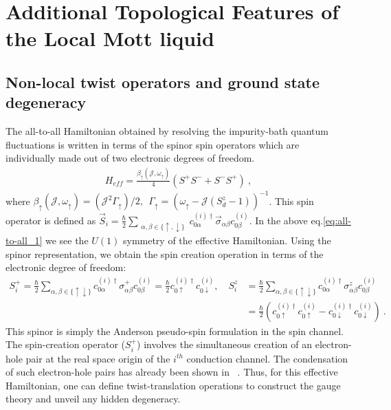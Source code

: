\documentclass[10pt]{iopart}
\begin{document}
\section{Additional Topological Features of the Local Mott liquid}
\subsection{Non-local twist operators and ground state degeneracy}

The all-to-all Hamiltonian obtained by resolving the impurity-bath quantum fluctuations is written in terms of the spinor spin operators which are individually made out of two electronic degrees of freedom.
\begin{eqnarray}
H_{eff} 
 =\frac{\beta_{\uparrow}({\mathcal{J}},\omega_{\uparrow})}{4} (S^+S^-+S^-S^+)~,
\label{eq:all-to-all_1}
\end{eqnarray}
where \(\beta_{\uparrow} ({\mathcal{J}},\omega_{\uparrow})= ({\mathcal{J}}^2 \Gamma_{\uparrow})/2, ~ ~\Gamma_{\uparrow}=(\omega_{\uparrow}-{\mathcal{J}}(S_d^z-1))^{-1}\). This spin operator is defined as $\vec{S}_i=\frac{\hbar}{2} \displaystyle\sum_{\substack{ \alpha,\beta\in \{\uparrow,\downarrow\}}}  c_{0\alpha}^{(i)\dagger} \vec{\sigma}_{\alpha\beta} c_{0\beta}^{(i)}$. In the above eq.\eqref{eq:all-to-all_1} we see the $U(1)$ symmetry of the effective Hamiltonian. Using the spinor representation, we obtain the spin creation operation in terms of the electronic degree of freedom:
\begin{eqnarray}
S_i^+ = \frac{\hbar}{2} \displaystyle\sum_{\alpha,\beta\in \{\uparrow\downarrow\}} c_{0\alpha}^{(i)\dagger} {\sigma}^{+}_{\alpha\beta} c_{0\beta}^{(i)}
=\frac{\hbar}{2} c_{0\uparrow}^{(i)\dagger} c_{0\downarrow}^{(i)}, \quad S_i^z &= \frac{\hbar}{2} \displaystyle\sum_{\alpha,\beta\in \{\uparrow\downarrow\}} c_{0\alpha}^{(i)\dagger} {\sigma}^{z}_{\alpha\beta} c_{0\beta}^{(i)} \nonumber\\
									       &=\frac{\hbar}{2} (c_{0\uparrow}^{(i)\dagger} c_{0\uparrow}^{(i)} - c_{0\downarrow}^{(i)\dagger} c_{0\downarrow}^{(i)} )~.
\end{eqnarray}
This spinor is simply the Anderson pseudo-spin formulation in the spin channel. The spin-creation operator ($S_i^+$) involves the simultaneous creation of an electron-hole pair at the real space origin of the $i^{th}$ conduction channel. The condensation of such electron-hole pairs has already been shown in ~\cite{anirbanmott1,anirbanmott2}. Thus, for this effective Hamiltonian, one can define twist-translation operations to construct the gauge theory and unveil any hidden degeneracy.
\end{document}
